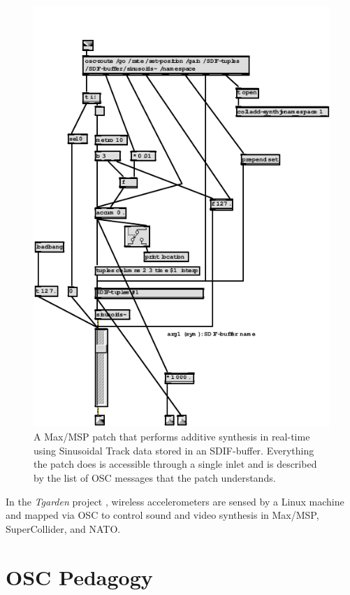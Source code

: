 \begin{figure}[t]
\centering
\includegraphics[width=\textwidth]{img-1-eps-converted-to-crop.pdf} 
\caption{A Max/MSP patch that performs additive synthesis in real-time using Sinusoidal Track data stored in an SDIF-buffer. Everything the patch does is accessible through a single inlet and is described by the list of OSC messages that the patch understands.}
\label{Wright:img-1}       %
\end{figure}

In the \textit{Tgarden} project \cite{Wei:2003}, wireless accelerometers are sensed by a Linux machine and mapped via OSC to control sound and video synthesis in Max/MSP, SuperCollider, and NATO.

\section{OSC Pedagogy}

